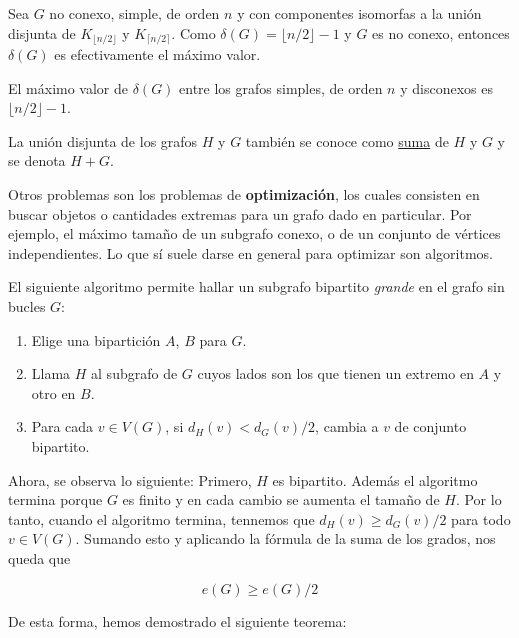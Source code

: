 \begin{ejem}
    Sea $G$ no conexo, simple, de orden $n$ y con componentes isomorfas a la unión disjunta de $K_{\lfloor n/2 \rfloor}$ y $K_{\lceil n/2 \rceil}$. Como $\delta(G) = \lfloor n/2 \rfloor - 1$ y $G$ es no conexo, entonces $\delta(G)$ es efectivamente el máximo valor.
\end{ejem}

\begin{teo}
    El máximo valor de $\delta(G)$ entre los grafos simples, de orden $n$ y disconexos es $\lfloor n/2 \rfloor - 1$.
\end{teo}

\begin{notn}
    La unión disjunta de los grafos $H$ y $G$ también se conoce como \ul{suma} de $H$ y $G$ y se denota $H + G$.
\end{notn}

Otros problemas son los problemas de \textbf{optimización}, los cuales consisten en buscar objetos o cantidades extremas para un grafo dado en particular. Por ejemplo, el máximo tamaño de un subgrafo conexo, o de un conjunto de vértices independientes. Lo que sí suele darse en general para optimizar son algoritmos.

\begin{ejem}
    El siguiente algoritmo permite hallar un subgrafo bipartito \textit{grande} en el grafo sin bucles $G$:
    
    \begin{enumerate}
        \item Elige una bipartición $A$, $B$ para $G$.
        \item Llama $H$ al subgrafo de $G$ cuyos lados son los que tienen un extremo en $A$ y otro en $B$.
        \item Para cada $v \in V(G)$, si $d_H(v) < d_G(v)/2$, cambia a $v$ de conjunto bipartito.
    \end{enumerate}
    
    Ahora, se observa lo siguiente: Primero, $H$ es bipartito. Además el algoritmo termina porque $G$ es finito y en cada cambio se aumenta el tamaño de $H$. Por lo tanto, cuando el algoritmo termina, tennemos que $d_H(v) \geq d_G(v)/2$ para todo $v \in V(G)$. Sumando esto y aplicando la fórmula de la suma de los grados, nos queda que
    
    \[
    e(G) \geq e(G)/2
    \]
\end{ejem}

De esta forma, hemos demostrado el siguiente teorema:

